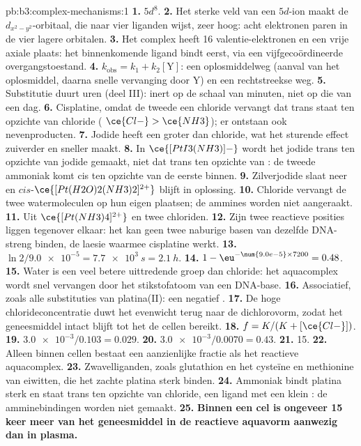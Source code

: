 \begin{solution}{pb:b3:complex-mechanisms:1}
\textbf{1.} $5d^8$.
\textbf{2.} Het sterke veld van een $5d$-ion maakt de $d_{x^2-y^2}$-orbitaal, die naar vier
liganden wijst, zeer hoog: acht elektronen paren in de vier lagere
orbitalen.
\textbf{3.} Het complex heeft 16 valentie-elektronen en een vrije axiale
plaats: het binnenkomende ligand bindt eerst, via een vijfgecoördineerde
overgangstoestand.
\textbf{4.} $k_{\mathrm{obs}} = k_1 + k_2[\mathrm Y]$: een oplosmiddelweg (aanval van het oplosmiddel, daarna snelle vervanging door Y)
en een rechtstreekse weg.
\textbf{5.} Substitutie duurt uren (deel III): inert op de schaal van
minuten, niet op die van een dag.
\textbf{6.} Cisplatine, omdat de tweede  een chloride vervangt dat trans staat ten opzichte van chloride
( $\ce{Cl-} > \ce{NH3}$); er ontstaan ook nevenproducten.
\textbf{7.} Jodide heeft een groter  dan chloride, wat het
sturende effect zuiverder en sneller maakt.
\textbf{8.} In $\ce{[PtI3(NH3)]-}$ wordt het jodide trans ten opzichte van jodide  gemaakt, niet dat trans ten opzichte van
: de tweede ammoniak komt cis ten opzichte van de eerste binnen.
\textbf{9.} Zilverjodide slaat neer en $cis$-$\ce{[Pt(H2O)2(NH3)2]^{2+}}$ blijft in oplossing.
\textbf{10.} Chloride vervangt de twee watermoleculen op hun eigen
plaatsen; de ammines worden niet aangeraakt.
\textbf{11.} Uit $\ce{[Pt(NH3)4]^{2+}}$ en twee chloriden.
\textbf{12.} Zijn twee reactieve posities liggen tegenover elkaar: het kan
geen twee naburige basen van dezelfde DNA-streng binden, de laesie
waarmee cisplatine werkt.
\textbf{13.} $\ln2/\num{9.0e-5} = \qty{7.7e3}{s} = \qty{2.1}{h}$.
\textbf{14.} $1 - \eu^{-\num{9.0e-5} \times 7200} = 0.48$.
\textbf{15.} Water is een veel betere uittredende groep dan chloride: het
aquacomplex wordt snel vervangen door het stikstofatoom van een DNA-base.
\textbf{16.} Associatief, zoals alle substituties van platina(II): een
negatief .
\textbf{17.} De hoge chlorideconcentratie duwt het evenwicht terug naar de
dichlorovorm, zodat het geneesmiddel intact blijft tot het de cellen
bereikt.
\textbf{18.} $f = K/(K + [\ce{Cl-}])$.
\textbf{19.} $\num{3.0e-3}/0.103 = 0.029$.
\textbf{20.} $\num{3.0e-3}/0.0070 = 0.43$.
\textbf{21.} 15.
\textbf{22.} Alleen binnen cellen bestaat een aanzienlijke fractie als het
reactieve aquacomplex.
\textbf{23.} Zwavelliganden, zoals glutathion en het cysteïne en methionine
van eiwitten, die het zachte platina sterk binden.
\textbf{24.} Ammoniak bindt platina sterk en staat trans ten opzichte van
chloride, een ligand met een klein : de amminebindingen
worden niet  gemaakt.
\textbf{25.} \textbf{Binnen een cel is ongeveer 15 keer meer van het
geneesmiddel in de reactieve aquavorm aanwezig dan in plasma.}
\end{solution}
